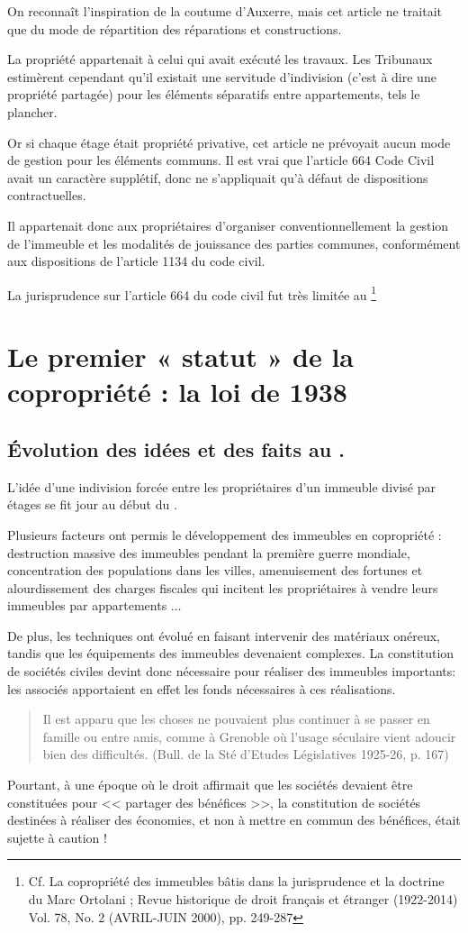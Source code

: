 		On reconnaît l'inspiration de la coutume d'Auxerre, mais cet article ne traitait que du mode de répartition des réparations et constructions.
		
		La propriété appartenait à celui qui avait exécuté les travaux. Les Tribunaux estimèrent cependant qu'il existait une servitude d'indivision (c’est à dire une propriété partagée) pour les éléments séparatifs entre appartements, tels le plancher.
		
		Or si chaque étage était propriété privative, cet article ne prévoyait aucun mode de gestion pour les éléments communs. Il est vrai que l'article 664 Code Civil avait un caractère supplétif, donc ne s'appliquait qu'à défaut de dispositions contractuelles.
		
		Il appartenait donc aux propriétaires d'organiser conventionnellement la gestion de l'immeuble et les modalités de jouissance des parties communes, conformément aux dispositions de l’article 1134 du code civil.
		
		La jurisprudence sur l’article 664 du code civil fut très limitée au \footnote{Cf. La copropriété des immeubles bâtis dans la jurisprudence et la doctrine du  Marc Ortolani ; Revue historique de droit français et étranger (1922-2014) Vol. 78, No. 2 (AVRIL-JUIN 2000), pp. 249-287}

\section{Le premier « statut » de la copropriété : la loi de 1938}

	\subsection{Évolution des idées et des faits au .}
		L'idée d'une indivision forcée entre les propriétaires d'un immeuble divisé par étages se fit jour au début du .
		
		Plusieurs facteurs ont permis le développement des immeubles en copropriété : destruction massive des immeubles pendant la première guerre mondiale, concentration des populations dans les villes, amenuisement des fortunes et alourdissement des charges fiscales qui incitent les propriétaires à vendre leurs immeubles par appartements $\dots$
		
		De plus, les techniques ont évolué en faisant intervenir des matériaux onéreux, tandis que les équipements des immeubles devenaient complexes.
		La constitution de sociétés civiles devint donc nécessaire pour réaliser des immeubles importants: les associés apportaient en effet les fonds nécessaires à ces réalisations.
		\begin{quote}
			Il est apparu que les choses ne pouvaient plus continuer à se passer en famille ou entre amis, comme à Grenoble où l'usage séculaire vient adoucir bien des difficultés. (Bull. de la Sté d'Etudes Législatives 1925-26, p. 167)
		\end{quote}
		Pourtant, à une époque où le droit affirmait que les sociétés devaient être constituées pour << partager des bénéfices >>, la constitution de sociétés destinées à réaliser des économies, et non à mettre en commun des bénéfices, était sujette à caution !
	
